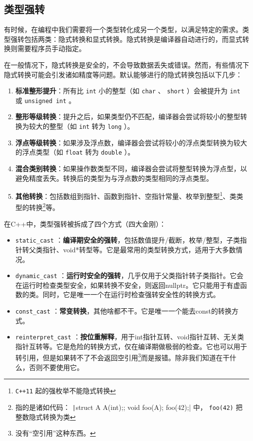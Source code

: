 \subsection{类型强转}

有时候，在编程中我们需要将一个类型转化成另一个类型，以满足特定的需求。类型强转包括两类：隐式转换和显式转换。隐式转换是编译器自动进行的，而显式转换则需要程序员手动指定。

在一般情况下，隐式转换是安全的，不会导致数据丢失或错误。然而，有些情况下隐式转换可能会引发诸如精度等问题。默认能够进行的隐式转换包括以下几步：
\begin{enumerate}
  \item \textbf{标准整形提升}：所有比 \texttt{int} 小的整型（如 \texttt{char} 、 \texttt{short} ）会被提升为 \texttt{int} 或 \texttt{unsigned int} 。
  \item \textbf{整形等级转换}：提升之后，如果类型仍不匹配，编译器会尝试将较小的整型转换为较大的整型（如 \texttt{int} 转为 \texttt{long} ）。
  \item \textbf{浮点等级转换}：如果涉及浮点数，编译器会尝试将较小的浮点类型转换为较大的浮点类型（如 \texttt{float} 转为 \texttt{double} ）。
  \item \textbf{混合类别转换}：如果操作数类型不同，编译器会尝试将整型转换为浮点型，以避免精度丢失。转换后的类型为与浮点数的类型相同的浮点类型。
  \item \textbf{其他转换}：包括数组到指针、函数到指针、空指针常量、枚举到整型\footnote{ \texttt{C++11} 起的强枚举不能隐式转换}、类类型的转换\footnote{指的是诸如代码： \texttt|struct A{ A(int);}; void foo(A); foo(42);| 中， \texttt{foo(42)} 把整数隐式转换为类}等。
\end{enumerate}

在C++中，类型强转被拆成了四个方式（四大金刚）：
\begin{itemize}
  \item  \texttt{static\_cast} ：\textbf{编译期安全的强转}，包括数值提升/截断，枚举/整型，子类指针转父类指针、void*转型等。它是最常用的类型转换方式，适用于大多数情况。
  \item  \texttt{dynamic\_cast} ：\textbf{运行时安全的强转}，几乎仅用于父类指针转子类指针。它会在运行时检查类型安全，如果转换不安全，则返回nullptr。它只能用于有虚函数的类。同时，它是唯一一个在运行时检查强转安全性的转换方式。
  \item  \texttt{const\_cast} ：\textbf{常变转换}，其他啥都不干。它是唯一一个能去const的转换方式。
  \item  \texttt{reinterpret\_cast} ：\textbf{按位重解释}，用于int指针互转、void指针互转、无关类指针互转等。它是危险的转换方式，仅在编译期做极弱的检查。它也可以用于转引用，但是如果转不了不会返回空引用\footnote{没有“空引用”这种东西。}而是报错。除非我们知道在干什么，否则不要使用它。
\end{itemize}

